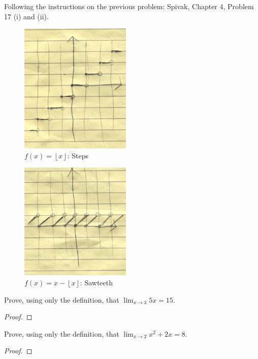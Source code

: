 \documentclass{article} %
\theoremstyle{plain}
\theoremstyle{definition}
\begin{document}
\vspace*{12pt}  %

\noindent{} Following the instructions on the previous problem: Spivak, Chapter 4, Problem 17 (i) and (ii). 

\begin{figure}[H]
    \includegraphics[width=200px]{steps.png}
    \caption{$f(x) = \left \lfloor {x} \right \rfloor$: Steps}
\end{figure}
\begin{figure}[H]
    \includegraphics[width=200px]{sawteeth.png}
    \caption{$f(x) = x - \left \lfloor {x} \right \rfloor$: Sawteeth}
\end{figure}

\vspace*{12pt}  %


\noindent{} Prove, using only the definition, that $\lim_{x \rightarrow 3} 5x = 15$. 

\begin{proof} 

\end{proof} 

\noindent{} Prove, using only the definition, that $\lim_{x \rightarrow 2} x^2+2x = 8$. 

\begin{proof} 

\end{proof} 
\end{document}

